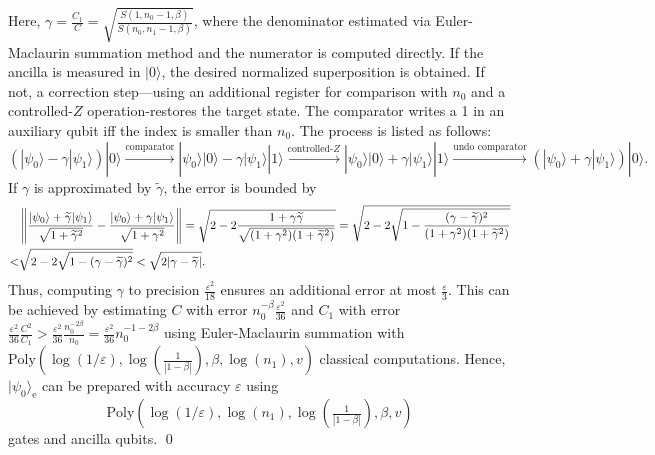 \documentclass[aps,pra,twocolumn,superscriptaddress,preprintnumbers,amsmath,amssymb]{revtex4-2}
\begin{document}
Here, $\gamma=\frac{C_1}{C}=\sqrt{\frac{S(1,n_0-1,\beta)}{S(n_0,n_1-1,\beta)}}$, where the denominator estimated via Euler-Maclaurin summation method and the numerator is computed directly. If the ancilla is measured in $|0\rangle$, the desired normalized superposition is obtained. If not, a correction step—using an additional register for comparison with $n_0$ and a controlled-$Z$ operation-restores the target state. The comparator writes a 1 in an auxiliary qubit iff the index is smaller than $n_0$. The process is listed as follows:
\begin{equation}
    (|\psi_0\rangle-\gamma|\psi_1\rangle)|0\rangle\xrightarrow{\text{comparator}}|\psi_0\rangle|0\rangle-\gamma|\psi_1\rangle|1\rangle\xrightarrow{\text{controlled-}Z}|\psi_0\rangle|0\rangle+\gamma|\psi_1\rangle|1\rangle\xrightarrow{\text{undo comparator}} (|\psi_0\rangle
+\gamma|\psi_1\rangle)|0\rangle.
\end{equation}
If $\gamma$ is approximated by $\widetilde{\gamma}$, the error is bounded by
\begin{align}
&\left\|\frac{|\psi_0\rangle+\widetilde{\gamma}|\psi_1\rangle}{\sqrt{1+\widetilde{\gamma}^2}}
-\frac{|\psi_0\rangle+\gamma|\psi_1\rangle}{\sqrt{1+\gamma^2}}\right\|
=\sqrt{2-2\frac{1+\gamma\widetilde{\gamma}}{\sqrt{(1+\gamma^2)(1+\widetilde{\gamma}^2)}}} 
=\sqrt{2-2\sqrt{1-\frac{(\gamma-\widetilde{\gamma})^2}{(1+\gamma^2)(1+\widetilde{\gamma}^2)}}} \notag\\
<& \sqrt{2-2\sqrt{1-(\gamma-\widetilde{\gamma})^2}} 
< \sqrt{2|\gamma-\widetilde{\gamma}|}.
\end{align}
Thus, computing $\gamma$ to precision $\frac{\varepsilon^2}{18}$ ensures an additional error at most $\frac{\varepsilon}{3}$. This can be achieved by estimating
 $C$ with error $n_0^{-\beta}\frac{\varepsilon^2}{36}$ and $C_1$ with error $\frac{\varepsilon^2}{36}\frac{C^2}{C_1}>\frac{\varepsilon^2}{36}\frac{n_0^{-2\beta}}{n_0}=\frac{\varepsilon^2}{36}n_0^{-1-2\beta}$ using Euler-Maclaurin summation with $\mathrm{Poly}(\log(1/\varepsilon),\log(\tfrac{1}{|1-\beta|}),\beta,\log(n_1),v)$ classical computations. Hence, $|\psi_0\rangle_{\mathrm{e}}$ can be prepared with accuracy $\varepsilon$ using
\begin{equation}
    \mathrm{Poly}(\log(1/\varepsilon),\log(n_1),\log(\tfrac{1}{|1-\beta|}),\beta,v)
\end{equation}
gates and ancilla qubits. \qed
\end{document}
